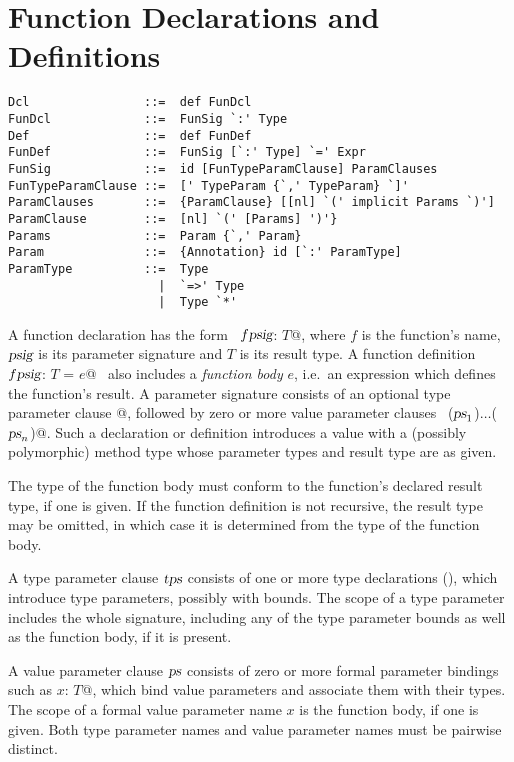 \section{Function Declarations and Definitions}
\label{sec:funsigs}

\syntax\begin{lstlisting} 
Dcl                ::=  def FunDcl
FunDcl             ::=  FunSig `:' Type
Def                ::=  def FunDef
FunDef             ::=  FunSig [`:' Type] `=' Expr 
FunSig             ::=  id [FunTypeParamClause] ParamClauses
FunTypeParamClause ::=  [' TypeParam {`,' TypeParam} `]' 
ParamClauses       ::=  {ParamClause} [[nl] `(' implicit Params `)']
ParamClause        ::=  [nl] `(' [Params] ')'} 
Params             ::=  Param {`,' Param}
Param              ::=  {Annotation} id [`:' ParamType]
ParamType          ::=  Type 
                     |  `=>' Type 
                     |  Type `*'
\end{lstlisting}

A function declaration has the form ~\lstinline@def $f \mbox{\sl psig}$: $T$@, where
$f$ is the function's name, $\mbox{\sl psig}$ is its parameter
signature and $T$ is its result type. A function definition
~\lstinline@def $f \mbox{\sl psig}$: $T$ = $e$@~ also includes a {\em function body} $e$,
i.e.\ an expression which defines the function's result.  A parameter
signature consists of an optional type parameter clause \lstinline@[$\tps\,$]@,
followed by zero or more value parameter clauses
~\lstinline@($\mbox{\sl ps}_1$)$\ldots$($\mbox{\sl ps}_n$)@.  Such a declaration or definition
introduces a value with a (possibly polymorphic) method type whose
parameter types and result type are as given.

The type of the function body must conform to the function's declared
result type, if one is given. If the function definition is not
recursive, the result type may be omitted, in which case it is
determined from the type of the function body.

A type parameter clause $\mbox{\sl tps}$ consists of one or more type
declarations (), which introduce type parameters,
possibly with bounds.  The scope of a type parameter includes
the whole signature, including any of the type parameter bounds as
well as the function body, if it is present.  

A value parameter clause $\mbox{\sl ps}$ consists of zero or more formal
parameter bindings such as \lstinline@$x$: $T$@, which bind value
parameters and associate them with their types.  The scope of a formal
value parameter name $x$ is the function body, if one is
given. Both type parameter names and value parameter names must be
pairwise distinct.

